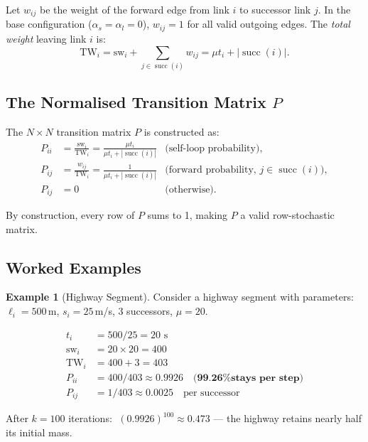 \documentclass[12pt,a4paper]{article}
\theoremstyle{definition}
\newtheorem{example}{Example}[section]
\theoremstyle{plain}
\newcommand{\sw}{\mathrm{sw}}
\newcommand{\TW}{\mathrm{TW}}
\begin{document}
Let $w_{ij}$ be the weight of the forward edge from link $i$ to successor link $j$.
In the base configuration ($\alpha_s = \alpha_l = 0$), $w_{ij} = 1$ for all valid
outgoing edges. The \emph{total weight} leaving link $i$ is:
\begin{equation}
  \TW_i = \sw_i + \sum_{j \in \operatorname{succ}(i)} w_{ij}
         = \mu t_i + |\operatorname{succ}(i)|.
\end{equation}

\subsection{The Normalised Transition Matrix $P$}

The $N \times N$ transition matrix $P$ is constructed as:
\begin{align}
  P_{ii} &= \frac{\sw_i}{\TW_i} = \frac{\mu t_i}{\mu t_i + |\operatorname{succ}(i)|}
  & \text{(self-loop probability)},\\[6pt]
  P_{ij} &= \frac{w_{ij}}{\TW_i} = \frac{1}{\mu t_i + |\operatorname{succ}(i)|}
  & \text{(forward probability, } j \in \operatorname{succ}(i)\text{)},\\[6pt]
  P_{ij} &= 0 & \text{(otherwise)}.
\end{align}

By construction, every row of $P$ sums to 1, making $P$ a valid row-stochastic matrix.

\subsection{Worked Examples}

\begin{example}[Highway Segment]
  \label{ex:highway}
  Consider a highway segment with parameters: $\ell_i = 500$\,m, $s_i = 25$\,m/s,
  3 successors, $\mu = 20$.

  \begin{align*}
    t_i &= 500 / 25 = 20\text{ s}\\
    \sw_i &= 20 \times 20 = 400\\
    \TW_i &= 400 + 3 = 403\\[4pt]
    P_{ii} &= 400 / 403 \approx 0.9926 \quad \textbf{(99.26\% stays per step)}\\
    P_{ij} &= 1   / 403 \approx 0.0025 \quad \text{per successor}
  \end{align*}

  After $k=100$ iterations:
  $\; (0.9926)^{100} \approx 0.473$ --- the highway retains nearly half its initial mass.
\end{example}
\end{document}

